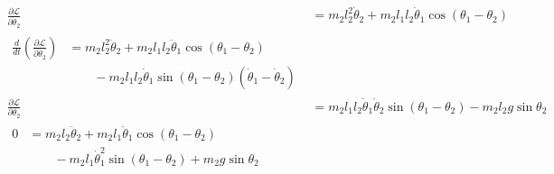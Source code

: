 \begin{align}
	\frac{\partial \mathcal{L}}{\partial \dot\theta_2}&=m_2l_2^2\dot\theta_2+m_2l_1l_2\dot\theta_1\cos{(\theta_1-\theta_2)}\\
	\begin{split}
		\frac{d}{dt}\left(\frac{\partial \mathcal{L}}{\partial \dot\theta_2}\right)&=m_2l_2^2\ddot\theta_2+m_2l_1l_2\ddot\theta_1\cos{(\theta_1-\theta_2)}\\
		&\qquad -m_2l_1l_2\dot\theta_1\sin{(\theta_1-\theta_2)}(\dot\theta_1-\dot\theta_2)
	\end{split}\\
	\frac{\partial \mathcal{L}}{\partial \theta_2} &=m_2l_1l_2\dot\theta_1\dot\theta_2\sin{(\theta_1-\theta_2)}-m_2l_2g\sin{\theta_2}\\
	\label{eq:part}
	\begin{split}
		0&=m_2l_2\ddot\theta_2+m_2l_1\ddot\theta_1\cos{(\theta_1-\theta_2)}\\
		&\qquad-m_2l_1\dot\theta_1^2\sin{(\theta_1-\theta_2)}+m_2g\sin{\theta_2}
	\end{split}
\end{align}

